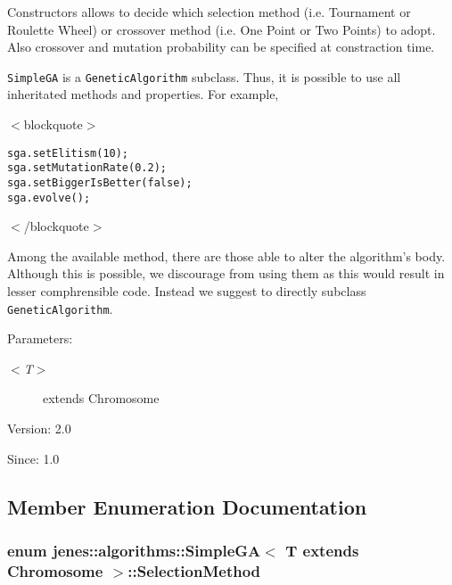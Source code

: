 Constructors allows to decide which selection method (i.e. Tournament or Roulette Wheel) or crossover method (i.e. One Point or Two Points) to adopt. Also crossover and mutation probability can be specified at constraction time. 

{\tt SimpleGA} is a {\tt GeneticAlgorithm} subclass. Thus, it is possible to use all inheritated methods and properties. For example, 

$<$blockquote$>$\small\begin{alltt}
  sga.setElitism(10);
  sga.setMutationRate(0.2);
  sga.setBiggerIsBetter(false);
  sga.evolve();
 \end{alltt}
\normalsize 
$<$/blockquote$>$ 

Among the available method, there are those able to alter the algorithm's body. Although this is possible, we discourage from using them as this would result in lesser comphrensible code. Instead we suggest to directly subclass {\tt GeneticAlgorithm}. 

\begin{Desc}
\item[Parameters:]
\begin{description}
\item[{\em $<$T$>$}]extends Chromosome\end{description}
\end{Desc}
\begin{Desc}
\item[Version:]2.0 \end{Desc}
\begin{Desc}
\item[Since:]1.0 \end{Desc}


\subsection{Member Enumeration Documentation}
\hypertarget{classjenes_1_1algorithms_1_1_simple_g_a_3_01_t_01extends_01_chromosome_01_4_6310e8ba52593a9b9ab7809caa9ba296}{
\subsubsection[SelectionMethod]{\setlength{\rightskip}{0pt plus 5cm}enum jenes::algorithms::SimpleGA$<$ T extends Chromosome $>$::{\bf SelectionMethod}}}
\label{classjenes_1_1algorithms_1_1_simple_g_a_3_01_t_01extends_01_chromosome_01_4_6310e8ba52593a9b9ab7809caa9ba296}


